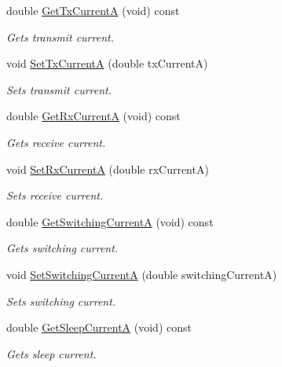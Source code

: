 \begin{DoxyCompactItemize}
double \hyperlink{classns3_1_1WifiRadioEnergyModel_acd12496e021e0d8a096b61a6b2e5263c}{Get\+Tx\+CurrentA} (void) const 
\begin{DoxyCompactList}\small\item\em Gets transmit current. \end{DoxyCompactList}\item 
void \hyperlink{classns3_1_1WifiRadioEnergyModel_a7c3e79aab7ec54d8cd39777d75288e69}{Set\+Tx\+CurrentA} (double tx\+CurrentA)
\begin{DoxyCompactList}\small\item\em Sets transmit current. \end{DoxyCompactList}\item 
double \hyperlink{classns3_1_1WifiRadioEnergyModel_a720fcc160a64f12da94efab74fcebf81}{Get\+Rx\+CurrentA} (void) const 
\begin{DoxyCompactList}\small\item\em Gets receive current. \end{DoxyCompactList}\item 
void \hyperlink{classns3_1_1WifiRadioEnergyModel_a61ec24c769756468a21332659f805ddc}{Set\+Rx\+CurrentA} (double rx\+CurrentA)
\begin{DoxyCompactList}\small\item\em Sets receive current. \end{DoxyCompactList}\item 
double \hyperlink{classns3_1_1WifiRadioEnergyModel_a616decc2a1cc0d9f97564ac647282638}{Get\+Switching\+CurrentA} (void) const 
\begin{DoxyCompactList}\small\item\em Gets switching current. \end{DoxyCompactList}\item 
void \hyperlink{classns3_1_1WifiRadioEnergyModel_abf01728dcaaa4cf7c3adc76e0dfa7f62}{Set\+Switching\+CurrentA} (double switching\+CurrentA)
\begin{DoxyCompactList}\small\item\em Sets switching current. \end{DoxyCompactList}\item 
double \hyperlink{classns3_1_1WifiRadioEnergyModel_a4b2c29b0645c30020d6fe88332a719c3}{Get\+Sleep\+CurrentA} (void) const 
\begin{DoxyCompactList}\small\item\em Gets sleep current. \end{DoxyCompactList}\item 

\end{DoxyCompactItemize}
